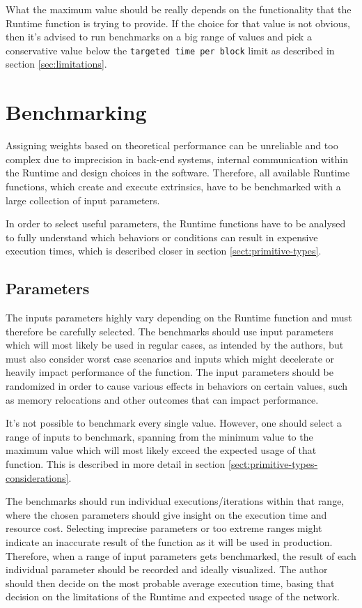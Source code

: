 \documentclass[11pt,a4paper]{article}
\begin{document}
\label{para:max-value} What the maximum value should be really depends on the
functionality that the Runtime function is trying to provide. If the choice for
that value is not obvious, then it's advised to run benchmarks on a big range of
values and pick a conservative value below the \verb|targeted time per block|
limit as described in section \ref{sec:limitations}.

\section{Benchmarking}\label{sect:benchmarking} Assigning weights based on
theoretical performance can be unreliable and too complex due to imprecision in
back-end systems, internal communication within the Runtime and design choices
in the software. Therefore, all available Runtime functions, which create and
execute extrinsics, have to be benchmarked with a large collection of input
parameters.
\newline

In order to select useful parameters, the Runtime functions have to be analysed
to fully understand which behaviors or conditions can result in expensive
execution times, which is described closer in section
\ref{sect:primitive-types}.

\subsection{Parameters}
The inputs parameters highly vary depending on the Runtime function and must
therefore be carefully selected. The benchmarks should use input parameters
which will most likely be used in regular cases, as intended by the authors, but
must also consider worst case scenarios and inputs which might decelerate or
heavily impact performance of the function. The input parameters should be
randomized in order to cause various effects in behaviors on certain values,
such as memory relocations and other outcomes that can impact performance.
\newline

It's not possible to benchmark every single value. However, one should select a
range of inputs to benchmark, spanning from the minimum value to the maximum
value which will most likely exceed the expected usage of that function. This is
described in more detail in section \ref{sect:primitive-types-considerations}.
\newline

The benchmarks should run individual executions/iterations within that range,
where the chosen parameters should give insight on the execution time and
resource cost. Selecting imprecise parameters or too extreme ranges might
indicate an inaccurate result of the function as it will be used in production.
Therefore, when a range of input parameters gets benchmarked, the result of each
individual parameter should be recorded and ideally visualized. The author
should then decide on the most probable average execution time, basing that
decision on the limitations of the Runtime and expected usage of the network.
\newline
\end{document}
